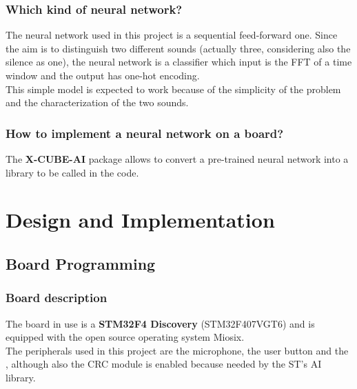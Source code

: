 \documentclass[12pt]{article}
\begin{document}
\subsubsection{Which kind of neural network?}
The neural network used in this project is a sequential feed-forward one. Since the aim is to distinguish two different sounds (actually three, considering also the silence as one), the neural network is a classifier which input is the FFT of a time window and the output has one-hot encoding.\\
This simple model is expected to work because of the simplicity of the problem and the characterization of the two sounds.

\subsubsection{How to implement a neural network on a board?}
The \textbf{X-CUBE-AI} package allows to convert a pre-trained neural network into a library to be called in the code.

\section{Design and Implementation}
\subsection{Board Programming}
\subsubsection{Board description}
The board in use is a \textbf{STM32F4 Discovery} (STM32F407VGT6) and is equipped with the open source operating system Miosix.\\
The peripherals used in this project are the microphone, the user button and the , although also the CRC module is enabled because needed by the ST's AI library.
\end{document}
